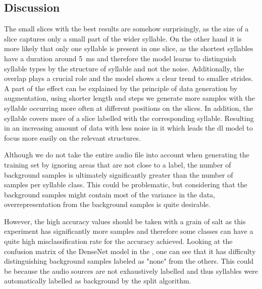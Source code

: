 \subsection{Discussion}
The small slices with the best results are somehow surprisingly, as the size of a slice captures only a small part of the wider syllable. On the other hand it is more likely that only one syllable is present in one slice, as the shortest syllables have a duration around \SI{5}{\milli\second} and therefore the model learns to distinguish syllable types by the structure of syllable and not the noise.
Additionally, the overlap plays a crucial role and the model shows a clear trend to smaller strides.
A part of the effect can be explained by the principle of data generation by augmentation, using shorter length and steps we generate more samples with the syllable occurring more often at different positions on the slices.
In addition, the syllable covers more of a slice labelled with the corresponding syllable.
Resulting in an increasing amount of data with less noise in it which leads the \gls{dl} model to focus more easily on the relevant structures.

Although we do not take the entire audio file into account when generating the training set by ignoring areas that are not close to a label, the number of background samples is ultimately significantly greater than the number of samples per syllable class.
This could be problematic, but considering that the background samples might contain most of the variance in the data, overrepresentation from the background samples is quite desirable.

However, the high accuracy values should be taken with a grain of salt as this experiment has significantly more samples and therefore some classes can have a quite high misclassification rate for the accuracy achieved. Looking at the confusion matrix of the DenseNet model \cite{nn_densNet_scs_r3_p30s5l60_raw_100} in the , one can see that it has difficulty distinguishing background samples labeled as "none" from the others.
This could be because the audio sources are not exhaustively labelled and thus syllables were automatically labelled as background by the split algorithm.


